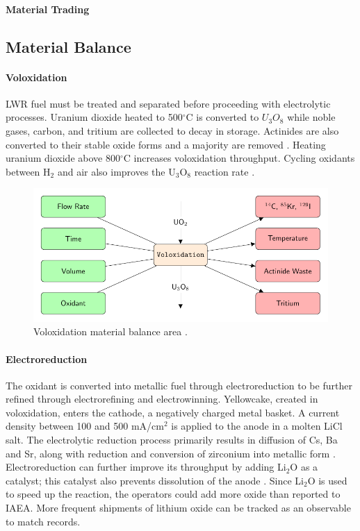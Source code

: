 \paragraph{Material Trading}

\subsection{Material Balance}
\paragraph{Voloxidation}

\gls{LWR} fuel must be treated and separated before proceeding with electrolytic processes. Uranium dioxide heated to 
500$^{\circ}$C is converted to $U_3O_8$ while noble gases, carbon, and tritium are collected to decay in storage. 
Actinides are also converted to their stable oxide forms and a majority are removed \cite{flowsheet_1998,jubin_spent_2009}. 
Heating uranium dioxide above 800$^{\circ}$C increases voloxidation throughput.
Cycling oxidants between H$_2$ and air also improves the U$_3$O$_8$ reaction rate \cite{jubin_spent_2009}.

\begin{figure} 
	\centering
	\includegraphics[width=0.9\linewidth]{images/volox}
	\caption{Voloxidation material balance area \cite{jubin_spent_2009}.}
	\label{fig:volox}
\end{figure}

\paragraph{Electroreduction}

The oxidant is converted into metallic fuel through electroreduction to be further refined through electrorefining and electrowinning. 
Yellowcake, created in voloxidation, enters the cathode, a negatively charged metal basket. 
A current density between 100 and 500 mA/cm$^2$ is applied to the anode in a molten LiCl salt. 
The electrolytic reduction process primarily results in diffusion of Cs, Ba and Sr, along with reduction and conversion of zirconium into metallic form \cite{choi_electrochemical_2015,flowsheet_1998}.
Electroreduction can further improve its throughput by adding Li$_2$O as a catalyst; this catalyst also prevents dissolution 
of the anode \cite{choi_electrochemical_2015}. Since Li$_2$O is used to speed up the reaction,
the operators could add more oxide than reported to \gls{IAEA}. More frequent shipments 
of lithium oxide can be tracked as an observable to match records.

